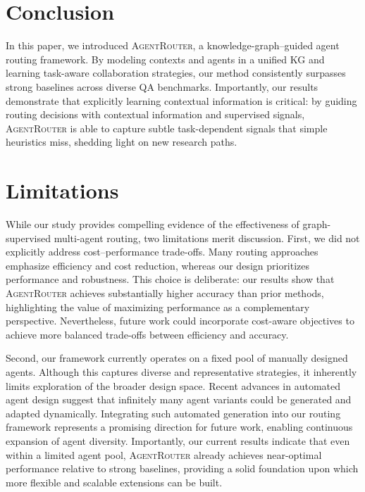 \documentclass[11pt]{article}
\begin{document}
\section{Conclusion}
In this paper, we introduced \textsc{AgentRouter}, a knowledge-graph–guided agent routing framework. By modeling contexts and agents in a unified KG and learning task-aware collaboration strategies, our method consistently surpasses strong baselines across diverse QA benchmarks. Importantly, our results demonstrate that explicitly learning contextual information is critical: by guiding routing decisions with contextual information and supervised signals, \textsc{AgentRouter} is able to capture subtle task-dependent signals that simple heuristics miss, shedding light on new research paths. 


\newpage

\section*{Limitations}
While our study provides compelling evidence of the effectiveness of graph-supervised multi-agent routing, two limitations merit discussion. First, we did not explicitly address cost–performance trade-offs. Many routing approaches emphasize efficiency and cost reduction, whereas our design prioritizes performance and robustness. This choice is deliberate: our results show that \textsc{AgentRouter} achieves substantially higher accuracy than prior methods, highlighting the value of maximizing performance as a complementary perspective. Nevertheless, future work could incorporate cost-aware objectives to achieve more balanced trade-offs between efficiency and accuracy.  

Second, our framework currently operates on a fixed pool of manually designed agents. Although this captures diverse and representative strategies, it inherently limits exploration of the broader design space. Recent advances in automated agent design suggest that infinitely many agent variants could be generated and adapted dynamically. Integrating such automated generation into our routing framework represents a promising direction for future work, enabling continuous expansion of agent diversity. Importantly, our current results indicate that even within a limited agent pool, \textsc{AgentRouter} already achieves near-optimal performance relative to strong baselines, providing a solid foundation upon which more flexible and scalable extensions can be built.
\end{document}
